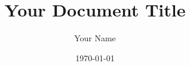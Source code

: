 




\author{Your Name}
\title{Your Document Title}
\subject{Your Subject}
\def \vorlesung {Your Course/Seminar Name}
\def \semester {Your Semester/Date}
\def \dozent {Your Professor/Advisor}
\date{\today}
